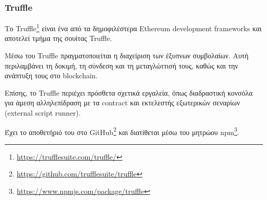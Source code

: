 \subsubsection{Truffle} \label{subsection:4-2-3-1-truffle}


Το Truffle\footnote{\url{https://trufflesuite.com/truffle/}} είναι ένα από τα δημοφιλέστερα Ethereum development frameworks και αποτελεί τμήμα της σουίτας Truffle.

Μέσω του Truffle πραγματοποιείται η διαχείριση των έξυπνων συμβολαίων. Αυτή περιλαμβάνει τη δοκιμή, τη σύνδεση και τη μεταγλώττισή τους, καθώς και την ανάπτυξη τους στο blockchain.

Επίσης, το Truffle περιέχει πρόσθετα σχετικά εργαλεία, όπως διαδραστική κονσόλα για άμεση αλληλεπίδραση με τα contract και εκτελεστής εξωτερικών σεναρίων (external script runner). 

Έχει το αποθετήριό του στο GitHub\footnote{\url{https://github.com/trufflesuite/truffle}} και διατίθεται μέσω του μητρώου npm\footnote{\url{https://www.npmjs.com/package/truffle}}.